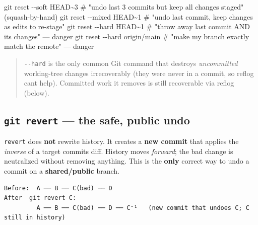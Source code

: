 \documentclass[11pt]{article}
\newenvironment{Shaded}{\begin{snugshade}}{\end{snugshade}}
\newcommand{\AttributeTok}[1]{\textcolor[rgb]{0.16,0.50,0.73}{#1}}
\newcommand{\CommentTok}[1]{\textcolor[rgb]{0.48,0.49,0.49}{#1}}
\newcommand{\FunctionTok}[1]{\textcolor[rgb]{0.56,0.27,0.68}{#1}}
\newcommand{\NormalTok}[1]{\textcolor[rgb]{0.81,0.81,0.76}{#1}}
\begin{document}
\begin{Shaded}
\begin{Highlighting}[]
\FunctionTok{git}\NormalTok{ reset }\AttributeTok{{-}{-}soft}\NormalTok{ HEAD\textasciitilde{}3   }\CommentTok{\# "undo last 3 commits but keep all changes staged" (squash{-}by{-}hand)}
\FunctionTok{git}\NormalTok{ reset }\AttributeTok{{-}{-}mixed}\NormalTok{ HEAD\textasciitilde{}1  }\CommentTok{\# "undo last commit, keep changes as edits to re{-}stage"}
\FunctionTok{git}\NormalTok{ reset }\AttributeTok{{-}{-}hard}\NormalTok{ HEAD\textasciitilde{}1   }\CommentTok{\# "throw away last commit AND its changes" — danger}
\FunctionTok{git}\NormalTok{ reset }\AttributeTok{{-}{-}hard}\NormalTok{ origin/main  }\CommentTok{\# "make my branch exactly match the remote" — danger}
\end{Highlighting}
\end{Shaded}

\begin{quote}
\texttt{-\/-hard} is the only common Git command that destroys \emph{uncommitted} working-tree changes irrecoverably (they were never in a commit, so reflog can\textquotesingle t help). Committed work it removes is still recoverable via reflog (below).
\end{quote}

\subsection{\texorpdfstring{\texttt{git\ revert} --- the safe, public undo}{git revert --- the safe, public undo}}\label{git-revert--the-safe-public-undo}

\texttt{revert} does \textbf{not} rewrite history. It creates a \textbf{new commit} that applies the \emph{inverse} of a target commit\textquotesingle s diff. History moves \emph{forward}; the bad change is neutralized without removing anything. This is the \textbf{only} correct way to undo a commit on a \textbf{shared/public} branch.

\setcodelang{}

\begin{verbatim}
Before:  A ── B ── C(bad) ── D
After  git revert C:
         A ── B ── C(bad) ── D ── C⁻¹   (new commit that undoes C; C still in history)
\end{verbatim}

\end{document}
